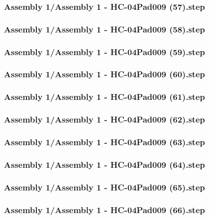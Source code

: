 \documentclass[a4paper,12pt]{article}
\begin{document}
\begin{lstlising}[language=C++]
\subsubsection{Assembly 1/Assembly 1 - HC-04Pad009 (57).step}

\subsubsection{Assembly 1/Assembly 1 - HC-04Pad009 (58).step}

\subsubsection{Assembly 1/Assembly 1 - HC-04Pad009 (59).step}

\subsubsection{Assembly 1/Assembly 1 - HC-04Pad009 (60).step}

\subsubsection{Assembly 1/Assembly 1 - HC-04Pad009 (61).step}

\subsubsection{Assembly 1/Assembly 1 - HC-04Pad009 (62).step}

\subsubsection{Assembly 1/Assembly 1 - HC-04Pad009 (63).step}

\subsubsection{Assembly 1/Assembly 1 - HC-04Pad009 (64).step}

\subsubsection{Assembly 1/Assembly 1 - HC-04Pad009 (65).step}

\subsubsection{Assembly 1/Assembly 1 - HC-04Pad009 (66).step}


\end{lstlising}
\end{document}
